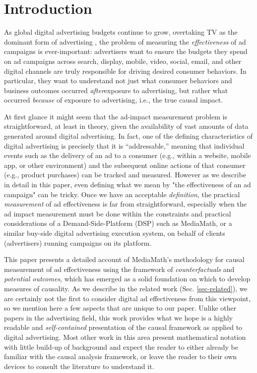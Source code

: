 \documentclass[11pt,a4paper]{article}
\theoremstyle{definition}
\theoremstyle{remark}
\theoremstyle{definition}
\theoremstyle{definition}
\theoremstyle{definition}
\theoremstyle{definition}
\theoremstyle{definition}
\theoremstyle{definition}
\begin{document}
\section{Introduction}

As global digital advertising budgets continue to grow, overtaking TV as the dominant form of advertising \cite{emarketer.com_2016},
the problem of measuring the \textit{effectiveness} of ad campaigns is ever-important: 
advertisers want to ensure the budgets they spend on ad campaigns across search, display, mobile, video, social, email, and other digital channels are truly responsible for driving desired consumer behaviors. In particular, they want to understand not just what consumer behaviors and business outcomes occurred \textit{after}exposure to advertising, but rather what occurred \textit{because} of exposure to advertising, i.e., the true causal impact.

At first glance it might seem that the ad-impact measurement problem is  straightforward, at least in theory,  
given the availability of vast amounts of data generated around digital advertising. In fact, one of the defining characteristics of digital advertising is precisely that it is “addressable,” meaning that individual events such as the delivery of an ad to a consumer (e.g., within a website, mobile app, or other environment) and the subsequent online actions of that consumer (e.g., product purchases) can be tracked and measured. However as we describe in detail in this paper, even defining what we mean by "the effectiveness of an ad campaign" can be tricky. Once we have an acceptable \textit{definition}, the practical \textit{measurement} of ad effectiveness is far from straightforward, especially when the ad impact measurement must be done within the constraints and practical considerations of a Demand-Side-Platform (DSP) such as MediaMath, or a similar buy-side digital advertising execution system, on behalf of clients (advertisers) running campaigns on its platform.

This paper presents a detailed account of MediaMath's methodology for causal measurement of ad effectiveness 
using the  framework of \textit{counterfactuals} and \textit{potential outcomes}, which has emerged as a solid foundation on which to develop measures of causality. As we describe in the related work (Sec. \ref{sec-related}), we are certainly not the first to consider digital ad effectiveness from this viewpoint, so we mention here a few aspects that are unique to our paper. Unlike other papers in the advertising field, this work provides what we hope is a highly readable and \textit{self-contained} presentation of the causal framework as applied to digital advertising. Most other work in this area present mathematical notation with little build-up of background and expect the reader to either already be familiar with the causal analysis framework, or leave the reader to their own devices to consult the literature to understand it. 
\end{document}
